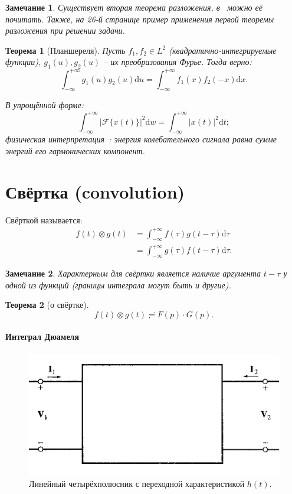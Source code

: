 \documentclass[12pt]{report}
\newcommand{\F}{\mathcal F}
\newcommand{\rd}{\mathrm d}
\newtheorem{thm}{Теорема}
\newtheorem{rmk}{Замечание}
\begin{document}
\begin{rmk}
	Существует вторая теорема разложения, в~\cite[стр.~27]{Dubkov:Lecture} можно её почитать. 
	Также, на 26-й странице пример применения первой теоремы разложения при решении задачи.
\end{rmk}

\begin{thm}[Планшереля]
	Пусть $f_1,f_2 \in L^2$ (квадратично-интегрируемые функции), $g_1(u), g_2(u)$ -- их преобразования Фурье. Тогда верно:
	\[
	\int_{-\infty}^{+\infty} g_1(u)g_2(u)\rd u = \int_{-\infty}^{+\infty} f_1(x)f_2(-x)\rd x.
	\]
	
	В упрощённой форме:
	\[
	\int_{-\infty}^{+\infty} |\F\{x(t)\}|^2\rd w = \int_{-\infty}^{+\infty}|x(t)|^2\rd t;
	\]
	физическая интерпретация~\cite[после~ф-лы~8]{Plancherel}: \emph{энергия колебательного сигнала равна сумме энергий его гармонических компонент.}
\end{thm}

\section{Свёртка (convolution)}
Свёрткой называется:
\begin{align*}
f(t)\otimes g(t) &= \int_{-\infty}^{+\infty} f(\tau)g(t-\tau)\rd\tau \\
&= \int_{-\infty}^{+\infty} g(\tau)f(t-\tau)\rd\tau.
\end{align*}

\begin{rmk}
	Характерным для свёртки является наличие аргумента $t-\tau$ у одной из функций (границы интеграла могут быть и другие).
\end{rmk}

\begin{thm}[о свёртке\label{thm:convolution}]
	\[
	f(t)\otimes g(t)\risingdotseq F(p)\cdot G(p).
	\]
\end{thm}

\paragraph{Интеграл Дюамеля}
\begin{figure}[h]\centering
	\includegraphics[width=\linewidth]{quadripole}
	\caption{Линейный четырёхполюсник с переходной характеристикой $h(t)$.\label{fig:quadripole}}
\end{figure}
\end{document}
